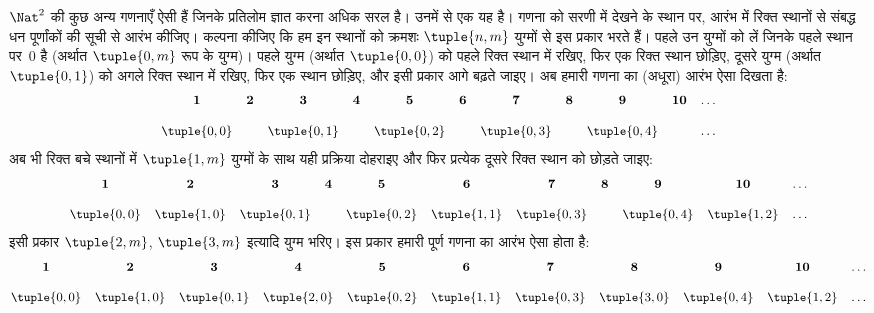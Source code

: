 \documentclass[../../../include/open-logic-section]{subfiles}
\begin{document}


\begin{explain}
$\Nat^2$ की कुछ अन्य गणनाएँ ऐसी हैं जिनके प्रतिलोम ज्ञात करना अधिक सरल है।
उनमें से एक यह है। गणना को सरणी में देखने के स्थान पर, आरंभ में रिक्त स्थानों
से संबद्ध धन पूर्णांकों की सूची से आरंभ कीजिए। कल्पना कीजिए कि हम इन स्थानों
को क्रमशः $\tuple{n,m}$ युग्मों से इस प्रकार भरते हैं। पहले उन युग्मों को लें
जिनके पहले स्थान पर~$0$ है (अर्थात $\tuple{0,m}$ रूप के युग्म)। पहले युग्म
(अर्थात $\tuple{0,0}$) को पहले रिक्त स्थान में रखिए, फिर एक रिक्त स्थान छोड़िए,
दूसरे युग्म (अर्थात $\tuple{0,1}$) को अगले रिक्त स्थान में रखिए, फिर एक स्थान
छोड़िए, और इसी प्रकार आगे बढ़ते जाइए। अब हमारी गणना का (अधूरा) आरंभ ऐसा
दिखता है:
\[\small
\begin{array}{@{}c c c c c c c c c c c@{}}
\mathbf 1 & \mathbf 2 & \mathbf 3 & \mathbf 4 & \mathbf 5 & \mathbf 6 & \mathbf 7 & \mathbf 8 & \mathbf 9 & \mathbf{10} & \dots \\ \\
\tuple{0,0} &  & \tuple{0,1} &  & \tuple{0,2} &  & \tuple{0,3} & & \tuple{0,4} &  & \dots \\
\end{array}
\]
अब भी रिक्त बचे स्थानों में $\tuple{1,m}$ युग्मों के साथ यही प्रक्रिया
दोहराइए और फिर प्रत्येक दूसरे रिक्त स्थान को छोड़ते जाइए:
\[\small
\begin{array}{@{}c c c c c c c c c c c@{}}
\mathbf 1 & \mathbf 2 & \mathbf 3 & \mathbf 4 & \mathbf 5 & \mathbf 6 & \mathbf 7 & \mathbf 8 & \mathbf 9 & \mathbf{10} & \dots \\ \\
\tuple{0,0} & \tuple{1,0} & \tuple{0,1} &  & \tuple{0,2} & \tuple{1,1} & 
\tuple{0,3} & & \tuple{0,4} &  \tuple{1,2} & \dots \\
\end{array}
\]
इसी प्रकार $\tuple{2,m}$, $\tuple{3,m}$ इत्यादि युग्म भरिए। इस प्रकार हमारी
पूर्ण गणना का आरंभ ऐसा होता है:
\[\small
\begin{array}{@{}cc c c c c c c c c c@{}}
\mathbf 1 & \mathbf 2 & \mathbf 3 & \mathbf 4 & \mathbf 5 & \mathbf 6 & \mathbf 7 & \mathbf 8 & \mathbf 9 & \mathbf{10} & \dots \\ \\
\tuple{0,0} & \tuple{1,0} & \tuple{0,1} & \tuple{2,0}  & \tuple{0,2} & 
\tuple{1,1} & \tuple{0,3} & \tuple{3,0}  & \tuple{0,4} &  \tuple{1,2} & \dots \\
\end{array}
\]
\end{explain}
\end{document}
